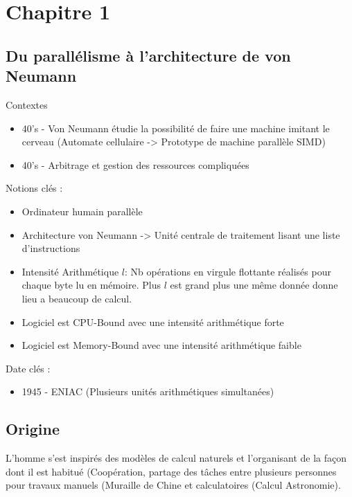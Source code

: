 \documentclass[12pt,a4paper,oneside, titlepage]{article}
\begin{document}
\renewcommand{\labelitemi}{$\bullet$}
\setlength\parindent{0pt}

\section*{Chapitre 1}

\subsection*{Du parallélisme à l'architecture de von Neumann}

Contextes

\begin{itemize}
\item 40's - Von Neumann étudie la possibilité de faire une machine imitant le cerveau (Automate cellulaire -> Prototype de machine parallèle SIMD)
\item 40's - Arbitrage et gestion des ressources compliquées
\end{itemize}

Notions clés : 

\begin{itemize}
\item Ordinateur humain parallèle
\item Architecture von Neumann -> Unité centrale de traitement lisant une liste d'instructions
\item Intensité Arithmétique $l$: Nb opérations en virgule flottante réalisés pour chaque byte lu en mémoire. Plus $l$ est grand plus une même donnée donne lieu a beaucoup de calcul.
\item Logiciel est CPU-Bound avec une intensité arithmétique forte
\item Logiciel est Memory-Bound avec une intensité arithmétique faible
\end{itemize}
Date clés :

\begin{itemize}
\item 1945 - ENIAC (Plusieurs unités arithmétiques simultanées)
\end{itemize}

\subsection*{Origine}
L'homme s'est inspirés des modèles de calcul naturels et l'organisant de la façon dont il est habitué (Coopération, partage des tâches entre plusieurs personnes pour travaux manuels (Muraille de Chine et calculatoires (Calcul Astronomie). \newline
\end{document}
